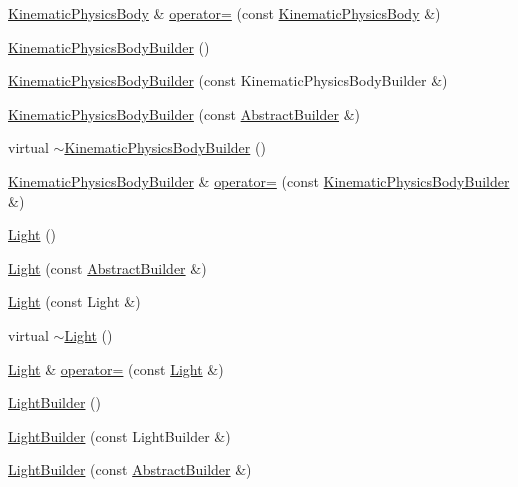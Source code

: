 \begin{DoxyCompactItemize}
\hyperlink{namespacejli_a7a3913d5239a7a26f7b249c8352cfb7e}{Kinematic\+Physics\+Body} \& \hyperlink{namespacejli_a9dd32a4ec75ec13088b16fd9814601cd}{operator=} (const \hyperlink{namespacejli_a7a3913d5239a7a26f7b249c8352cfb7e}{Kinematic\+Physics\+Body} \&)
\item 
\hyperlink{namespacejli_a7c18f18400fc9c3348d7888cd25a57d7}{Kinematic\+Physics\+Body\+Builder} ()
\item 
\hyperlink{namespacejli_a41d3966b2a78be58e202899d74ba0875}{Kinematic\+Physics\+Body\+Builder} (const Kinematic\+Physics\+Body\+Builder \&)
\item 
\hyperlink{namespacejli_a50acbc03a306ce042f59e76accc35c43}{Kinematic\+Physics\+Body\+Builder} (const \hyperlink{classjli_1_1_abstract_builder}{Abstract\+Builder} \&)
\item 
virtual \hyperlink{namespacejli_a4e01e4f68c5489e4b57284f99bddba69}{$\sim$\+Kinematic\+Physics\+Body\+Builder} ()
\item 
\hyperlink{namespacejli_a7c18f18400fc9c3348d7888cd25a57d7}{Kinematic\+Physics\+Body\+Builder} \& \hyperlink{namespacejli_ab7a97bb558d975fef79c14180602daf6}{operator=} (const \hyperlink{namespacejli_a7c18f18400fc9c3348d7888cd25a57d7}{Kinematic\+Physics\+Body\+Builder} \&)
\item 
\hyperlink{namespacejli_aa743de893683a76d6d6862899d5c9c95}{Light} ()
\item 
\hyperlink{namespacejli_a4df8986faaac7b2936c1b4c2570e30ea}{Light} (const \hyperlink{classjli_1_1_abstract_builder}{Abstract\+Builder} \&)
\item 
\hyperlink{namespacejli_aa3b8b43415275515956d5c46a0715ccb}{Light} (const Light \&)
\item 
virtual \hyperlink{namespacejli_aae4231474bb8c3e59ac1454da254b3a7}{$\sim$\+Light} ()
\item 
\hyperlink{namespacejli_aa743de893683a76d6d6862899d5c9c95}{Light} \& \hyperlink{namespacejli_a7a1252c0a9ccb9ee23d13cf04ebb17dd}{operator=} (const \hyperlink{namespacejli_aa743de893683a76d6d6862899d5c9c95}{Light} \&)
\item 
\hyperlink{namespacejli_ab74bc38edd1ef6ffefa07b38a456dbf4}{Light\+Builder} ()
\item 
\hyperlink{namespacejli_a1db92fb58477bc8af86269d5cddc8685}{Light\+Builder} (const Light\+Builder \&)
\item 
\hyperlink{namespacejli_ae17e3ea054277db213f8262dc1f99949}{Light\+Builder} (const \hyperlink{classjli_1_1_abstract_builder}{Abstract\+Builder} \&)
\item 

\end{DoxyCompactItemize}
